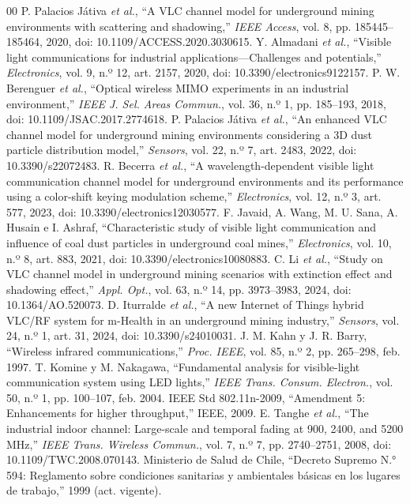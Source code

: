 \documentclass[conference]{IEEEtran}
\begin{document}
\begin{thebibliography}{00}
 P. Palacios Játiva \emph{et al.}, ``A VLC channel model for underground mining environments with scattering and shadowing,'' \emph{IEEE Access}, vol. 8, pp. 185445--185464, 2020, doi: 10.1109/ACCESS.2020.3030615.
 Y. Almadani \emph{et al.}, ``Visible light communications for industrial applications---Challenges and potentials,'' \emph{Electronics}, vol. 9, n.º 12, art. 2157, 2020, doi: 10.3390/electronics9122157.
 P. W. Berenguer \emph{et al.}, ``Optical wireless MIMO experiments in an industrial environment,'' \emph{IEEE J. Sel. Areas Commun.}, vol. 36, n.º 1, pp. 185--193, 2018, doi: 10.1109/JSAC.2017.2774618.
 P. Palacios Játiva \emph{et al.}, ``An enhanced VLC channel model for underground mining environments considering a 3D dust particle distribution model,'' \emph{Sensors}, vol. 22, n.º 7, art. 2483, 2022, doi: 10.3390/s22072483.
 R. Becerra \emph{et al.}, ``A wavelength-dependent visible light communication channel model for underground environments and its performance using a color-shift keying modulation scheme,'' \emph{Electronics}, vol. 12, n.º 3, art. 577, 2023, doi: 10.3390/electronics12030577.
 F. Javaid, A. Wang, M. U. Sana, A. Husain e I. Ashraf, ``Characteristic study of visible light communication and influence of coal dust particles in underground coal mines,'' \emph{Electronics}, vol. 10, n.º 8, art. 883, 2021, doi: 10.3390/electronics10080883.
 C. Li \emph{et al.}, ``Study on VLC channel model in underground mining scenarios with extinction effect and shadowing effect,'' \emph{Appl. Opt.}, vol. 63, n.º 14, pp. 3973--3983, 2024, doi: 10.1364/AO.520073.
 D. Iturralde \emph{et al.}, ``A new Internet of Things hybrid VLC/RF system for m-Health in an underground mining industry,'' \emph{Sensors}, vol. 24, n.º 1, art. 31, 2024, doi: 10.3390/s24010031.
 J. M. Kahn y J. R. Barry, ``Wireless infrared communications,'' \emph{Proc. IEEE}, vol. 85, n.º 2, pp. 265--298, feb. 1997.
 T. Komine y M. Nakagawa, ``Fundamental analysis for visible-light communication system using LED lights,'' \emph{IEEE Trans. Consum. Electron.}, vol. 50, n.º 1, pp. 100--107, feb. 2004.
 IEEE Std 802.11n-2009, ``Amendment 5: Enhancements for higher throughput,'' IEEE, 2009.
 E. Tanghe \emph{et al.}, ``The industrial indoor channel: Large-scale and temporal fading at 900, 2400, and 5200 MHz,'' \emph{IEEE Trans. Wireless Commun.}, vol. 7, n.º 7, pp. 2740--2751, 2008, doi: 10.1109/TWC.2008.070143.
 Ministerio de Salud de Chile, ``Decreto Supremo N.° 594: Reglamento sobre condiciones sanitarias y ambientales básicas en los lugares de trabajo,'' 1999 (act. vigente).
\end{thebibliography}
\end{document}
